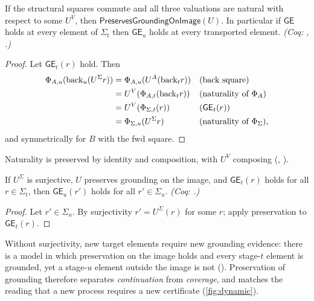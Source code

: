 \begin{thm}\label{thm:preserve}
If the structural squares commute and all three valuations are natural with respect to some $U^V$, then $\mathsf{PreservesGroundingOnImage}(U)$. In particular if $\mathsf{GE}$ holds at every element of $\Sigma_t$ then $\mathsf{GE}_u$ holds at every transported element. \emph{(Coq: , .)}
\end{thm}
\begin{proof}
Let $\mathsf{GE}_t(r)$ hold. Then
\begin{align*}
\Phi_{A,u}(\mathrm{back}_u(U^\Sigma r)) &= \Phi_{A,u}(U^A(\mathrm{back}_t r)) && \text{(back square)}\\
&= U^V(\Phi_{A,t}(\mathrm{back}_t r)) && \text{(naturality of $\Phi_A$)}\\
&= U^V(\Phi_{\Sigma,t}(r)) && \text{($\mathsf{GE}_t(r)$)}\\
&= \Phi_{\Sigma,u}(U^\Sigma r) && \text{(naturality of $\Phi_\Sigma$)},
\end{align*}
and symmetrically for $B$ with the fwd square.
\end{proof}
Naturality is preserved by identity and composition, with $U^V$ composing (, ).

\begin{thm}\label{thm:coverage}
If $U^\Sigma$ is surjective, $U$ preserves grounding on the image, and $\mathsf{GE}_t(r)$ holds for all $r \in \Sigma_t$, then $\mathsf{GE}_u(r')$ holds for all $r' \in \Sigma_u$. \emph{(Coq: .)}
\end{thm}
\begin{proof}
Let $r' \in \Sigma_u$. By surjectivity $r' = U^\Sigma(r)$ for some $r$; apply preservation to $\mathsf{GE}_t(r)$.
\end{proof}
Without surjectivity, new target elements require new grounding evidence: there is a model in which preservation on the image holds and every stage-$t$ element is grounded, yet a stage-$u$ element outside the image is not (). Preservation of grounding therefore separates \emph{continuation} from \emph{coverage}, and matches the reading that a new process requires a new certificate (\cref{fig:dynamic}).

